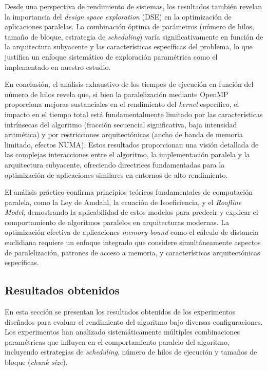         Desde una perspectiva de rendimiento de sistemas, los resultados también revelan la importancia del \textit{design space exploration} (DSE) en la optimización de aplicaciones paralelas. La combinación óptima de parámetros (número de hilos, tamaño de bloque, estrategia de \textit{scheduling}) varía significativamente en función de la arquitectura subyacente y las características específicas del problema, lo que justifica un enfoque sistemático de exploración paramétrica como el implementado en nuestro estudio.
                
        En conclusión, el análisis exhaustivo de los tiempos de ejecución en función del número de hilos revela que, si bien la paralelización mediante OpenMP proporciona mejoras sustanciales en el rendimiento del \textit{kernel} específico, el impacto en el tiempo total está fundamentalmente limitado por las características intrínsecas del algoritmo (fracción secuencial significativa, baja intensidad aritmética) y por restricciones arquitectónicas (ancho de banda de memoria limitado, efectos NUMA). Estos resultados proporcionan una visión detallada de las complejas interacciones entre el algoritmo, la implementación paralela y la arquitectura subyacente, ofreciendo directrices fundamentadas para la optimización de aplicaciones similares en entornos de alto rendimiento.
        
        El análisis práctico confirma principios teóricos fundamentales de computación paralela, como la Ley de Amdahl, la ecuación de Isoeficiencia, y el \textit{Roofline Model}, demostrando la aplicabilidad de estos modelos para predecir y explicar el comportamiento de algoritmos paralelos en arquitecturas modernas. La optimización efectiva de aplicaciones \textit{memory-bound} como el cálculo de distancia euclidiana requiere un enfoque integrado que considere simultáneamente aspectos de paralelización, patrones de acceso a memoria, y características arquitectónicas específicas.
    
    \subsection{Resultados obtenidos}

        En esta sección se presentan los resultados obtenidos de los experimentos diseñados para evaluar el rendimiento del algoritmo bajo diversas configuraciones. Los experimentos han analizado sistemáticamente múltiples combinaciones paramétricas que influyen en el comportamiento paralelo del algoritmo, incluyendo estrategias de \textit{scheduling}, número de hilos de ejecución y tamaños de bloque (\textit{chunk size}).
        
